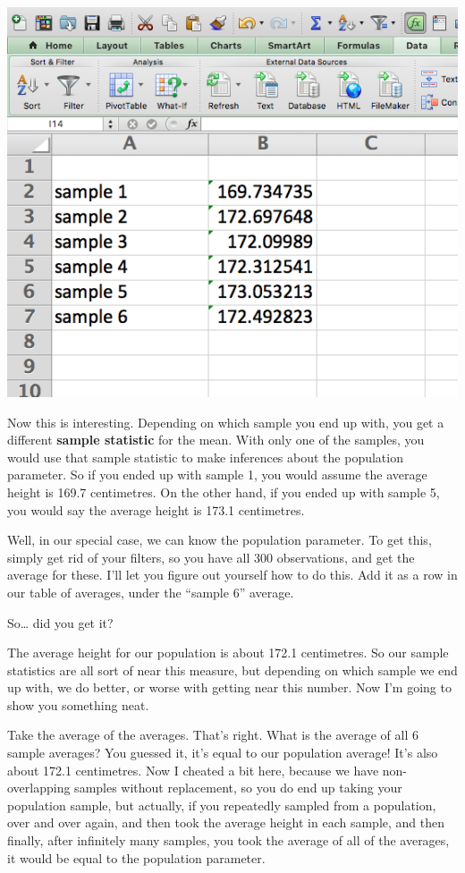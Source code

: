 \documentclass[]{book}
\theoremstyle{definition}
\theoremstyle{definition}
\theoremstyle{definition}
\theoremstyle{remark}
\begin{document}
\includegraphics{imgs/avg_per_sample.png}

Now this is interesting. Depending on which sample you end up with, you
get a different \textbf{sample statistic} for the mean. With only one of
the samples, you would use that sample statistic to make inferences
about the population parameter. So if you ended up with sample 1, you
would assume the average height is 169.7 centimetres. On the other hand,
if you ended up with sample 5, you would say the average height is 173.1
centimetres.

Well, in our special case, we can know the population parameter. To get
this, simply get rid of your filters, so you have all 300 observations,
and get the average for these. I'll let you figure out yourself how to
do this. Add it as a row in our table of averages, under the ``sample
6'' average.

So\ldots{} did you get it?

The average height for our population is about 172.1 centimetres. So our
sample statistics are all sort of near this measure, but depending on
which sample we end up with, we do better, or worse with getting near
this number. Now I'm going to show you something neat.

Take the average of the averages. That's right. What is the average of
all 6 sample averages? You guessed it, it's equal to our population
average! It's also about 172.1 centimetres. Now I cheated a bit here,
because we have non-overlapping samples without replacement, so you do
end up taking your population sample, but actually, if you repeatedly
sampled from a population, over and over again, and then took the
average height in each sample, and then finally, after infinitely many
samples, you took the average of all of the averages, it would be equal
to the population parameter.
\end{document}
